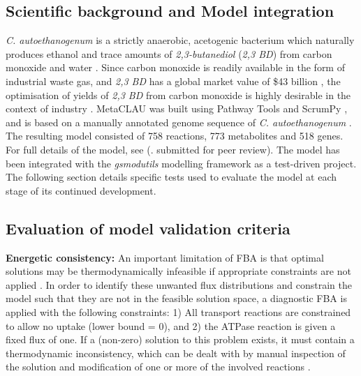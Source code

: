 \documentclass[journal=asbcd6]{achemso}
\begin{document}
\subsection{Scientific background and Model integration}

\textit{C. autoethanogenum} is a strictly anaerobic, acetogenic bacterium which naturally produces ethanol and trace amounts of \textit{2,3-butanediol} (\textit{2,3 BD}) from carbon monoxide and water \cite{abrini1994clostridium,schuchmann2014autotrophy,norman2018progress}. Since carbon monoxide is readily available in the form of industrial waste gas, and \textit{2,3 BD} has a global market value of \$43 billion \cite{kopke201123butanediol}, the optimisation of yields of \textit{2,3 BD} from carbon monoxide is highly desirable in the context of industry \cite{norman2018progress}.   
MetaCLAU was built using Pathway Tools \cite{karp2002pathway} and ScrumPy \cite{poolman2006scrumpy}, and is based on a manually annotated genome sequence of \textit{C. autoethanogenum} \cite{humphreys2015whole}. The resulting model consisted of 758 reactions, 773 metabolites and 518 genes. For full details of the model, see (\cite{norman2018progress}. submitted for peer review).
The model has been integrated with the \textit{gsmodutils} modelling framework as a test-driven project. 
The following section details specific tests used to evaluate the model at each stage of its continued development.

\subsection{Evaluation of model validation criteria}
\textbf{Energetic consistency:} 
An important limitation of FBA is that optimal solutions may be thermodynamically infeasible if appropriate constraints are not applied \cite{Fell1197rohtua}.
In order to identify these unwanted flux distributions and constrain the model such that they are not in the feasible solution space, a diagnostic FBA is applied with the following constraints:
1) All transport reactions are constrained to allow no uptake (lower bound = 0), and 2) the ATPase reaction is given a fixed flux of one.
If a (non-zero) solution to this problem exists, it must contain a thermodynamic inconsistency, which can be dealt with by manual inspection of the solution and modification of one or more of the involved reactions \cite{Fell1197rohtua}.
 
\end{document}
